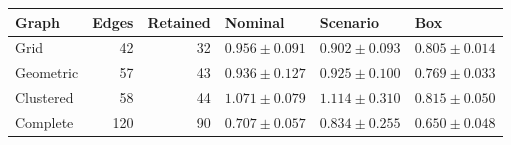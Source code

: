 \begin{tabular}{lrrlll}\toprule
Graph & Edges & Retained & Nominal & Scenario & Box\\\midrule
Grid & 42 & 32 & $0.956 \pm 0.091$ & $0.902 \pm 0.093$ & $0.805 \pm 0.014$\\
Geometric & 57 & 43 & $0.936 \pm 0.127$ & $0.925 \pm 0.100$ & $0.769 \pm 0.033$\\
Clustered & 58 & 44 & $1.071 \pm 0.079$ & $1.114 \pm 0.310$ & $0.815 \pm 0.050$\\
Complete & 120 & 90 & $0.707 \pm 0.057$ & $0.834 \pm 0.255$ & $0.650 \pm 0.048$\\
\bottomrule\end{tabular}
